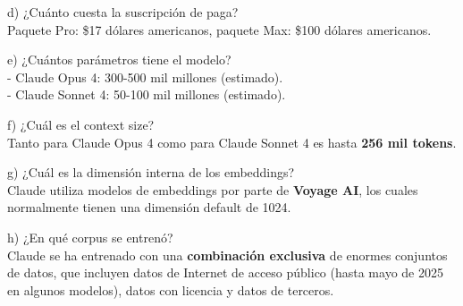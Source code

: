 \documentclass[a4paper, 11pt]{article}
\newcommand{\Aspace}{0.2cm}
\begin{document}
\begin{enumerate}
            \vspace{\Aspace} \par
            d) ¿Cuánto cuesta la suscripción de paga?
            \\ { \color{azul} Paquete Pro: \$17 dólares americanos, paquete Max: \$100 dólares americanos. \cite{claude2026pricing}}

            \vspace{\Aspace} \par
            e) ¿Cuántos parámetros tiene el modelo?
            \\ { \color{azul} 
                - Claude Opus 4: 300-500 mil millones (estimado). \\
                - Claude Sonnet 4: 50-100 mil millones (estimado). \cite{medium2025claude}
            }

            \vspace{\Aspace} \par
            f) ¿Cuál es el context size?
            \\ { \color{azul} Tanto para Claude Opus 4 como para Claude Sonnet 4 es hasta \textbf{256 mil tokens}. \cite{medium2025claude}}

            \vspace{\Aspace} \par
            g) ¿Cuál es la dimensión interna de los embeddings?
            \\ { \color{azul} Claude utiliza modelos de embeddings por parte de \textbf{Voyage AI}, los cuales normalmente tienen una dimensión default de 1024. \cite{claude2026embeddings}}

            \vspace{\Aspace} \par
            h) ¿En qué corpus se entrenó?
            \\ { \color{azul}Claude se ha entrenado con una \textbf{combinación exclusiva} de enormes conjuntos de datos, que incluyen datos de Internet de acceso público (hasta mayo de 2025 en algunos modelos), datos con licencia y datos de terceros. \cite{anthropic2026corpus} }



\end{enumerate}
\end{document}
